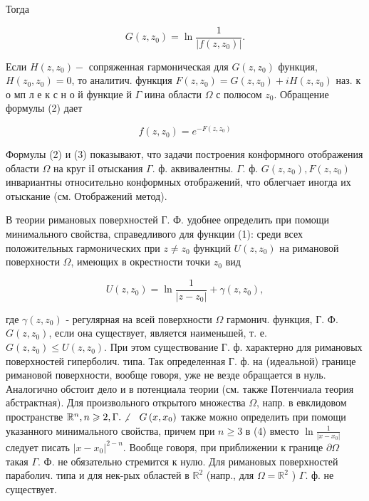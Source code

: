\documentclass[10pt]{article}
\begin{document}
Тогда



\[

G\left(z, z_{0}\right)=\ln \frac{1}{\left|f\left(z, z_{0}\right)\right|} .

\]



Если $H\left(z, z_{0}\right)-$ сопряженная гармоническая для $G\left(z, z_{0}\right)$ функция, $H\left(z_{0}, z_{0}\right)=0$, то аналитич. функция $F\left(z, z_{0}\right)=G\left(z, z_{0}\right)+i H\left(z, z_{0}\right)$ наз. к о мп л е к с н о й функцие й $\Gamma$ иина области $\Omega$ с полюсом $z_{0}$. Обращение формулы (2) дает



\[

f\left(z, z_{0}\right)=e^{-F\left(z, z_{0}\right)}

\]



Формулы (2) и (3) показывают, что задачи построения конформного отображения области $\Omega$ на круг іІ отыскания $\Gamma$. ф. аквивалентны. $\Gamma$. ф. $G\left(z, z_{0}\right), F\left(z, z_{0}\right)$ инвариантны относительно конформных отображений, что облегчает иногда их отыскание (см. Отображений метод).



В теории римановых поверхностей Г. Ф. удобнее определить при помощи минимального свойства, справедливого для функции (1): среди всех положительных гармонических при $z \neq z_{0}$ функций $U\left(z, z_{0}\right)$ на римановой поверхности $\Omega$, имеющих в окрестности точки $z_{0}$ вид



\[

U\left(z, z_{0}\right)=\ln \frac{1}{\left|z-z_{0}\right|}+\gamma\left(z, z_{0}\right),

\]



где $\gamma\left(z, z_{0}\right)$ - регулярная на всей поверхности $\Omega$ гармонич. функция, Г. Ф. $G\left(z, z_{0}\right)$, если она существует, является наименьшей, т. е. $G\left(z, z_{0}\right) \leqslant U\left(z, z_{0}\right)$. При этом существование Г. ф. характерно для римановых поверхностей гиперболич. типа. Так определенная Г. ф. на (идеальной) границе римановой поверхности, вообще говоря, уже не везде обращается в нуль. Аналогично обстоит дело и в потенциала теории (см. также Потенчиала теория абстрактная). Для произвольного открытого множества $\Omega$, напр. в евклидовом пространстве $\mathbb{R}^{n}, n \geqslant 2, \Gamma . \not . \quad G\left(x, x_{0}\right)$ также можно определить при помощи указанного минимального свойства, причем при $n \geqslant 3$ в (4) вместо $\ln \frac{1}{\left|x-x_{0}\right|}$ следует писать $\left|x-x_{0}\right|^{2-n}$. Вообще говоря, при приближении к границе $\partial \Omega$ такая $\Gamma$. Ф. не обязательно стремится к нулю. Для римановых поверхностей параболич. типа и для нек-рых областей в $\mathbb{R}^{2}$ (напр., для $\Omega=\mathbb{R}^{2}$ ) $\Gamma$. ф. не существует.
\end{document}
